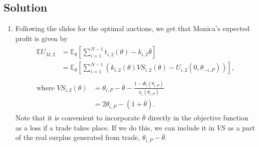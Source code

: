 \documentclass[a4paper]{article}
\begin{document}
	\subsection*{Solution}
	\begin{enumerate}
		\item Following the slides for the optimal auctions, we get that Monica's expected profit is given by
		\begin{gather}
			\begin{aligned} 
				\mathbb{E}U_{M,2} &= \mathbb{E}_\theta \left[ \sum_{i=1}^{N-1} t_{i,2}(\theta) - k_{i,2} \bar{\theta} \right]
				\\
				&= \mathbb{E}_\theta \left[ \sum_{i=1}^{N-1} \left(k_{i,2}(\theta) VS_{i,2}(\theta) - U_{i,2}(0,\theta_{-i,P})\right) \right],
				\label{eq:carauction}
			\end{aligned}
			\\
			\nonumber
			\begin{aligned} 
				\text{where } VS_{i,2}(\theta) &= \theta_{i,P} - \bar{\theta} - \frac{1-\Phi_i(\theta_{i,P})}{\phi_i(\theta_{i,P})}
				\\
				&= 2\theta_{i,P} - (1+\bar{\theta}).
			\end{aligned}
		\end{gather}
		Note that it is convenient to incorporate $\bar{\theta}$ directly in the objective function as a loss if a trade takes place. If we do this, we can include it in $VS$ as a part of the real surplus generated from trade, $\theta_{i,P} - \bar{\theta}$.
		

\end{enumerate}
\end{document}
